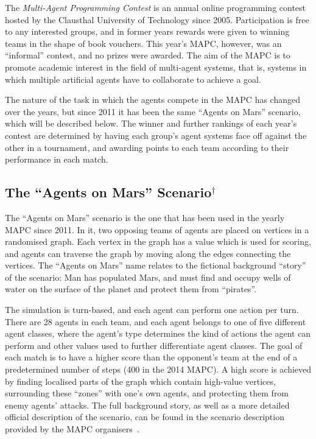 The \emph{Multi-Agent Programming Contest} is an annual online programming contest hosted by the Clausthal University of Technology since 2005.
Participation is free to any interested groups, and in former years rewards were given to winning teams in the shape of book vouchers.
This year's MAPC, however, was an \enquote{informal} contest, and no prizes were awarded.
The aim of the MAPC is to promote academic interest in the field of multi-agent systems, that is, systems in which multiple artificial agents have to collaborate to achieve a goal.

The nature of the task in which the agents compete in the MAPC has changed over the years, but since 2011 it has been the same \enquote{Agents on Mars} scenario, which will be described below.
The winner and further rankings of each year's contest are determined by having each group's agent systems face off against the other in a tournament, and awarding points to each team according to their performance in each match.

\subsection[The \enquote{Agents on Mars} Scenario]{The \enquote{Agents on Mars} Scenario$^\dagger$}
The \enquote{Agents on Mars} scenario is the one that has been used in the yearly MAPC since 2011.
In it, two opposing teams of agents are placed on vertices in a randomised graph.
Each vertex in the graph has a value which is used for scoring, and agents can traverse the graph by moving along the edges connecting the vertices.
The \enquote{Agents on Mars} name relates to the fictional background \enquote{story} of the scenario: Man has populated Mars, and must find and occupy wells of water on the surface of the planet and protect them from \enquote{pirates}.

The simulation is turn-based, and each agent can perform one action per turn.
There are 28 agents in each team, and each agent belongs to one of five different agent classes, where the agent's type determines the kind of actions the agent can perform and other values used to further differentiate agent classes.
The goal of each match is to have a higher score than the opponent's team at the end of a predetermined number of steps (400 in the 2014 MAPC).
A high score is achieved by finding localised parts of the graph which contain high-value vertices, surrounding these \enquote{zones} with one's own agents, and protecting them from enemy agents' attacks.
The full background story, as well as a more detailed official description of the scenario, can be found in the scenario description provided by the MAPC organisers~\cite{ahlbrecht_mapc_2014}.

